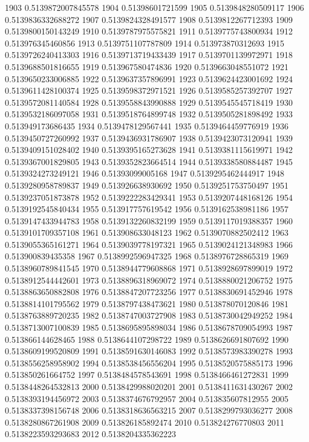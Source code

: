 1903 0.5139872007845578
1904 0.51398601721599
1905 0.5139848280509117
1906 0.5139836332688272
1907 0.5139824328491577
1908 0.5139812267712393
1909 0.5139800150143249
1910 0.5139787975575821
1911 0.5139775743800934
1912 0.513976345460856
1913 0.5139751107787809
1914 0.513973870312693
1915 0.5139726240413303
1916 0.5139713719433439
1917 0.5139701139972971
1918 0.5139688501816655
1919 0.513967580474836
1920 0.5139663048551072
1921 0.5139650233006885
1922 0.5139637357896991
1923 0.5139624423001692
1924 0.5139611428100374
1925 0.5139598372971521
1926 0.5139585257392707
1927 0.5139572081140584
1928 0.5139558843990888
1929 0.5139545545718419
1930 0.5139532186097058
1931 0.5139518764899748
1932 0.5139505281898492
1933 0.513949173686435
1934 0.5139478129567441
1935 0.5139464459776919
1936 0.5139450727260992
1937 0.5139436931786907
1938 0.5139423073120941
1939 0.5139409151028402
1940 0.5139395165273628
1941 0.5139381115619971
1942 0.5139367001829805
1943 0.5139352823664514
1944 0.5139338580884487
1945 0.5139324273249121
1946 0.51393099005168
1947 0.5139295462444917
1948 0.5139280958789837
1949 0.513926638930692
1950 0.5139251753750497
1951 0.5139237051873878
1952 0.5139222283429341
1953 0.5139207448168126
1954 0.5139192545840434
1955 0.513917757619542
1956 0.5139162538981186
1957 0.5139147433944783
1958 0.5139132260832199
1959 0.5139117019388357
1960 0.5139101709357108
1961 0.513908633048123
1962 0.5139070882502412
1963 0.5139055365161271
1964 0.5139039778197321
1965 0.5139024121348983
1966 0.513900839435358
1967 0.5138992596947325
1968 0.5138976728865319
1969 0.5138960789841545
1970 0.5138944779608868
1971 0.5138928697899019
1972 0.5138912544442601
1973 0.5138896318969072
1974 0.5138880021206752
1975 0.5138863650882808
1976 0.5138847207723256
1977 0.5138830691452946
1978 0.5138814101795562
1979 0.5138797438473621
1980 0.513878070120846
1981 0.5138763889720235
1982 0.5138747003727908
1983 0.5138730042949252
1984 0.5138713007100839
1985 0.5138695895898034
1986 0.5138678709054993
1987 0.513866144628465
1988 0.5138644107298722
1989 0.5138626691807692
1990 0.5138609199520809
1991 0.5138591630146083
1992 0.5138573983390278
1993 0.5138556258958902
1994 0.5138538456556204
1995 0.5138520575885173
1996 0.513850261664752
1997 0.5138484578543691
1998 0.5138466461272831
1999 0.5138448264532813
2000 0.5138429988020201
2001 0.5138411631430267
2002 0.5138393194456972
2003 0.5138374676792957
2004 0.513835607812955
2005 0.5138337398156748
2006 0.5138318636563215
2007 0.5138299793036277
2008 0.5138280867261908
2009 0.513826185892474
2010 0.513824276770803
2011 0.5138223593293683
2012 0.5138204335362223

